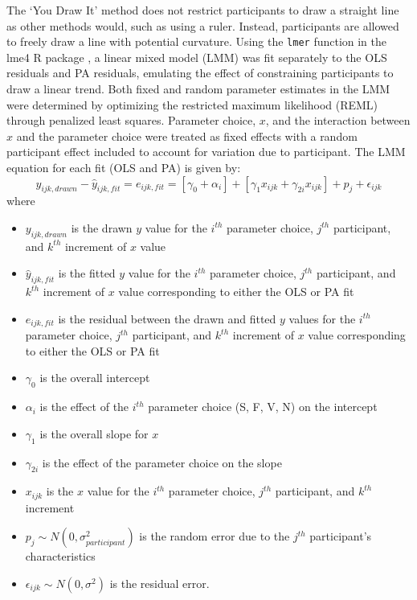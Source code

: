 \documentclass[12pt]{article}
\providecommand{\tightlist}{%
  \setlength{\itemsep}{0pt}\setlength{\parskip}{0pt}}
\begin{document}
The `You Draw It' method does not restrict participants to draw a
straight line as other methods would, such as using a ruler. Instead,
participants are allowed to freely draw a line with potential curvature.
Using the \texttt{lmer} function in the lme4 R package \citep{lme4}, a
linear mixed model (LMM) was fit separately to the OLS residuals and PA
residuals, emulating the effect of constraining participants to draw a
linear trend. Both fixed and random parameter estimates in the LMM were
determined by optimizing the restricted maximum likelihood (REML)
through penalized least squares. Parameter choice, \(x\), and the
interaction between \(x\) and the parameter choice were treated as fixed
effects with a random participant effect included to account for
variation due to participant. The LMM equation for each fit (OLS and PA)
is given by: \begin{equation}
y_{ijk,drawn} - \hat y_{ijk,fit} = e_{ijk,fit} = \left[\gamma_0 + \alpha_i\right] + \left[\gamma_{1} x_{ijk} + \gamma_{2i} x_{ijk}\right] + p_{j} + \epsilon_{ijk}
\end{equation} \noindent where

\begin{itemize}
\tightlist
\item
  \(y_{ijk,drawn}\) is the drawn \(y\) value for the \(i^{th}\)
  parameter choice, \(j^{th}\) participant, and \(k^{th}\) increment of
  \(x\) value
\item
  \(\hat y_{ijk,fit}\) is the fitted \(y\) value for the \(i^{th}\)
  parameter choice, \(j^{th}\) participant, and \(k^{th}\) increment of
  \(x\) value corresponding to either the OLS or PA fit
\item
  \(e_{ijk,fit}\) is the residual between the drawn and fitted \(y\)
  values for the \(i^{th}\) parameter choice, \(j^{th}\) participant,
  and \(k^{th}\) increment of \(x\) value corresponding to either the
  OLS or PA fit
\item
  \(\gamma_0\) is the overall intercept
\item
  \(\alpha_i\) is the effect of the \(i^{th}\) parameter choice (S, F,
  V, N) on the intercept
\item
  \(\gamma_1\) is the overall slope for \(x\)
\item
  \(\gamma_{2i}\) is the effect of the parameter choice on the slope
\item
  \(x_{ijk}\) is the \(x\) value for the \(i^{th}\) parameter choice,
  \(j^{th}\) participant, and \(k^{th}\) increment
\item
  \(p_{j} \sim N(0, \sigma^2_{participant})\) is the random error due to
  the \(j^{th}\) participant's characteristics
\item
  \(\epsilon_{ijk} \sim N(0, \sigma^2)\) is the residual error.
\end{itemize}
\end{document}
